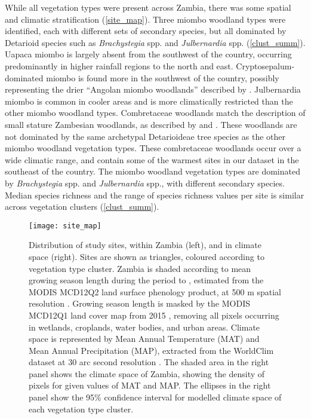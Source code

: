 \documentclass[11pt,a4paper]{article}
\begin{document}
While all vegetation types were present across Zambia, there was some spatial and climatic stratification (\autoref{site_map}). Three miombo woodland types were identified, each with different sets of secondary species, but all dominated by Detarioid species such as \textit{Brachystegia} spp. and \textit{Julbernardia} spp. (\autoref{clust_summ}). Uapaca miombo is largely absent from the southwest of the country, occurring predominantly in higher rainfall regions to the north and east. Cryptosepalum-dominated miombo is found more in the southwest of the country, possibly representing the drier ``Angolan miombo woodlands'' described by \citet{White1983}. Julbernardia miombo is common in cooler areas and is more climatically restricted than the other miombo woodland types. Combretaceae woodlands match the description of small stature Zambesian woodlands, as described by \citet{Dinerstein2017} and \citet{Chidumayo2001}. These woodlands are not dominated by the same archetypal Detarioideae tree species as the other miombo woodland vegetation types. These combretaceae woodlands occur over a wide climatic range, and contain some of the warmest sites in our dataset in the southeast of the country. The miombo woodland vegetation types are dominated by \textit{Brachystegia} spp. and \textit{Julbernardia} spp., with different secondary species. Median species richness and the range of species richness values per site is similar across vegetation clusters (\autoref{clust_summ}). 

\begin{figure}[H]
\centering
	\texttt{[image: site\_map]}
	\caption{Distribution of study sites, within Zambia (left), and in climate space (right). Sites are shown as triangles, coloured according to vegetation type cluster. Zambia is shaded according to mean growing season length during the period \modisStart{} to \modisEnd{}, estimated from the MODIS MCD12Q2 land surface phenology product, at 500 m spatial resolution \citep{MCD12Q2}. Growing season length is masked by the MODIS MCD12Q1 land cover map from 2015 \citep{MCD12Q1}, removing all pixels occurring in wetlands, croplands, water bodies, and urban areas. Climate space is represented by Mean Annual Temperature (MAT) and Mean Annual Precipitation (MAP), extracted from the WorldClim dataset at 30 arc second resolution \citep{Fick2017}. The shaded area in the right panel shows the climate space of Zambia, showing the density of pixels for given values of MAT and MAP. The ellipses in the right panel show the 95\% confidence interval for modelled climate space of each vegetation type cluster.} 
	\label{site_map}
\end{figure}
\end{document}
